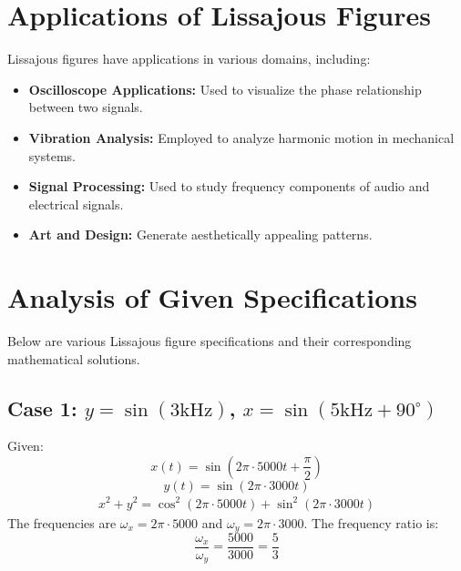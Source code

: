 \documentclass{article}
\begin{document}
\section{Applications of Lissajous Figures}
Lissajous figures have applications in various domains, including:
\begin{itemize}
\item \textbf{Oscilloscope Applications:} Used to visualize the phase relationship between two signals.
\item \textbf{Vibration Analysis:} Employed to analyze harmonic motion in mechanical systems.
\item \textbf{Signal Processing:} Used to study frequency components of audio and electrical signals.
\item \textbf{Art and Design:} Generate aesthetically appealing patterns.
\end{itemize}

\section{Analysis of Given Specifications}
Below are various Lissajous figure specifications and their corresponding mathematical solutions.

\subsection{Case 1: $y = \sin(3\text{kHz})$, $x = \sin(5\text{kHz} + 90^\circ)$}

Given:
\[
x(t) = \sin(2\pi \cdot 5000 t + \frac{\pi}{2})
\]
\[
y(t) = \sin(2\pi \cdot 3000 t)
\]
\begin{align*}
x^2 + y^2 = \cos^2(2\pi \cdot 5000t) + \sin^2(2\pi \cdot 3000t)
\end{align*}
The frequencies are \( \omega_x = 2\pi \cdot 5000 \) and \( \omega_y = 2\pi \cdot 3000 \). The frequency ratio is:
\[
\frac{\omega_x}{\omega_y} = \frac{5000}{3000} = \frac{5}{3}
\]
\end{document}

